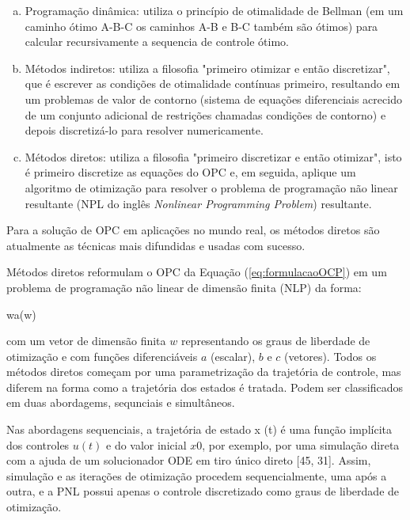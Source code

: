 \begin{enumerate}[(a)]
	\item Programação dinâmica: utiliza o princípio de otimalidade de Bellman (em um caminho ótimo A-B-C os caminhos A-B e B-C também são ótimos) para calcular recursivamente a sequencia de controle ótimo. 
	\item Métodos indiretos: utiliza a filosofia "primeiro otimizar e então discretizar", que é escrever as condições de otimalidade contínuas primeiro,
		resultando em um problemas de valor de contorno (sistema de equações diferenciais acrecido de um conjunto adicional de restrições chamadas condições de contorno) e depois discretizá-lo para resolver numericamente.
	\item Métodos diretos: utiliza a filosofia "primeiro discretizar e então otimizar", isto é primeiro discretize as equações do OPC e, em seguida, aplique um algoritmo de otimização para resolver o problema de programação 
	não linear resultante (NPL do inglês \textit{Nonlinear Programming Problem}) resultante.
\end{enumerate}

Para a solução de OPC em aplicações no mundo real, os métodos diretos são atualmente as técnicas mais difundidas e usadas com sucesso. \cite{article:Diehl,book:betts2010}

Métodos diretos reformulam o OPC da Equação (\ref{eq:formulacaoOCP}) em um problema de programação não linear de dimensão finita (NLP) da forma:

\begin{mini!}
	{w}{a(w) \label{eq:NPL1}}
	{\label{eq:NPL}}{}
\end{mini!}

com um vetor de dimensão finita $w$ representando os graus de liberdade de otimização e com funções diferenciáveis $a$ (escalar), $b$ e $c$ (vetores). 
Todos os métodos diretos começam por uma parametrização da trajetória de controle, mas diferem na forma como a trajetória dos estados é tratada. Podem ser classificados em duas abordagems, sequnciais e simultâneos. 

Nas abordagens sequenciais, a trajetória de estado x (t) é uma função implícita dos controles $u(t)$ e do valor inicial $x0$, por exemplo, por uma simulação direta com a ajuda de um solucionador ODE em tiro único direto [45, 31]. Assim, simulação
e as iterações de otimização procedem sequencialmente, uma após a outra, e a PNL possui apenas o controle discretizado como graus de liberdade de otimização.

